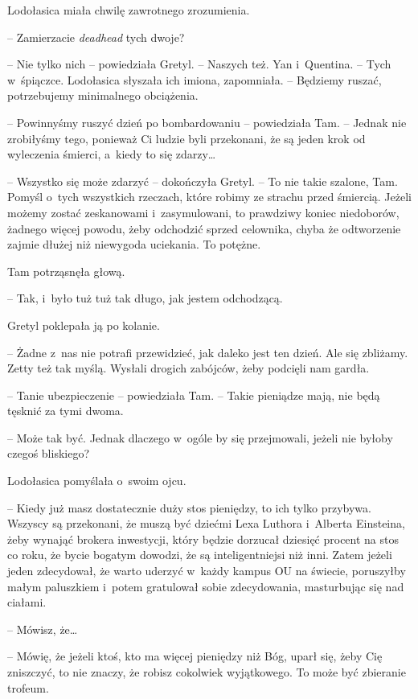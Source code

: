 \documentclass[oneside,polish,11pt,sfheadings]{mwbk}
\begin{document}
Lodołasica miała chwilę zawrotnego zrozumienia. 

-- Zamierzacie
\textit{deadhead} tych dwoje?

-- Nie tylko nich -- powiedziała Gretyl. -- Naszych też. Yan i~Quentina. -- Tych w~śpiączce. Lodołasica słyszała ich imiona, zapomniała. -- Będziemy
ruszać, potrzebujemy minimalnego obciążenia.

-- Powinnyśmy ruszyć dzień po bombardowaniu -- powiedziała Tam. -- Jednak
nie zrobiłyśmy tego, ponieważ Ci ludzie byli przekonani, że są jeden
krok od wyleczenia śmierci, a~kiedy to się zdarzy\ldots 

-- Wszystko się może zdarzyć -- dokończyła Gretyl. -- To nie takie szalone,
Tam. Pomyśl o~tych wszystkich rzeczach, które robimy ze strachu przed
śmiercią. Jeżeli możemy zostać zeskanowami i~zasymulowani, to prawdziwy
koniec niedoborów, żadnego więcej powodu, żeby odchodzić sprzed
celownika, chyba że odtworzenie zajmie dłużej niż niewygoda uciekania.
To potężne.

Tam potrząsnęła głową. 

-- Tak, i~było tuż tuż tak długo, jak jestem
odchodzącą.

Gretyl poklepała ją po kolanie. 

-- Żadne z~nas nie potrafi przewidzieć,
jak daleko jest ten dzień. Ale się zbliżamy. Zetty też tak myślą.
Wysłali drogich zabójców, żeby podcięli nam gardła.

-- Tanie ubezpieczenie -- powiedziała Tam. -- Takie pieniądze mają, nie
będą tęsknić za tymi dwoma.

-- Może tak być. Jednak dlaczego w~ogóle by się przejmowali, jeżeli nie
byłoby czegoś bliskiego?

Lodołasica pomyślała o~swoim ojcu. 

-- Kiedy już masz dostatecznie duży
stos pieniędzy, to ich tylko przybywa. Wszyscy są przekonani, że muszą
być dziećmi Lexa Luthora i~Alberta Einsteina, żeby wynająć brokera
inwestycji, który będzie dorzucał dziesięć procent na stos co roku, że
bycie bogatym dowodzi, że są inteligentniejsi niż inni. Zatem jeżeli
jeden zdecydował, że warto uderzyć w~każdy kampus OU na świecie,
poruszyłby małym paluszkiem i~potem gratulował sobie zdecydowania,
masturbując się nad ciałami.

-- Mówisz, że\ldots 

-- Mówię, że jeżeli ktoś, kto ma więcej pieniędzy niż Bóg, uparł się,
żeby Cię zniszczyć, to nie znaczy, że robisz cokolwiek wyjątkowego. To
może być zbieranie trofeum.
\end{document}

